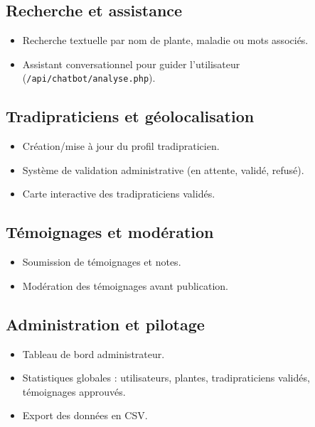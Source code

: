 \documentclass[12pt,a4paper]{article}
\begin{document}
\subsection{Recherche et assistance}
\begin{itemize}[leftmargin=1.2cm]
  \item Recherche textuelle par nom de plante, maladie ou mots associés.
  \item Assistant conversationnel pour guider l'utilisateur (\texttt{/api/chatbot/analyse.php}).
\end{itemize}

\subsection{Tradipraticiens et géolocalisation}
\begin{itemize}[leftmargin=1.2cm]
  \item Création/mise à jour du profil tradipraticien.
  \item Système de validation administrative (en attente, validé, refusé).
  \item Carte interactive des tradipraticiens validés.
\end{itemize}

\subsection{Témoignages et modération}
\begin{itemize}[leftmargin=1.2cm]
  \item Soumission de témoignages et notes.
  \item Modération des témoignages avant publication.
\end{itemize}

\subsection{Administration et pilotage}
\begin{itemize}[leftmargin=1.2cm]
  \item Tableau de bord administrateur.
  \item Statistiques globales : utilisateurs, plantes, tradipraticiens validés, témoignages approuvés.
  \item Export des données en CSV.
\end{itemize}
\end{document}
